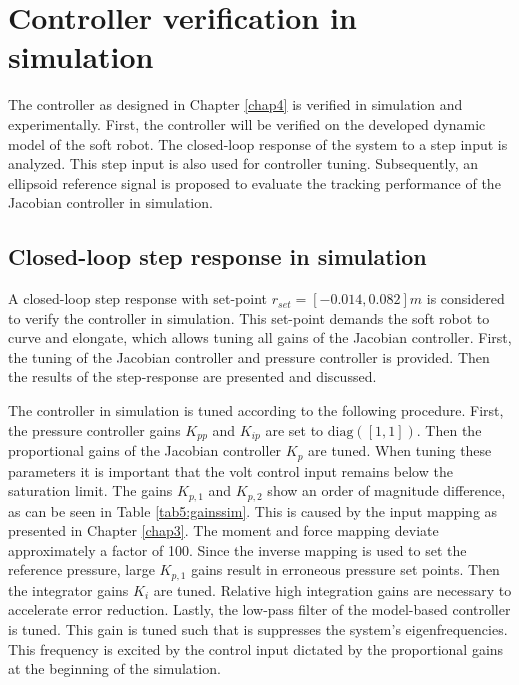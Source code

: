 \section{Controller verification in simulation}

The controller as designed in Chapter \ref{chap4} is verified in simulation and experimentally. First, the controller will be verified on the developed dynamic model of the soft robot. The closed-loop response of the system to a step input is analyzed. This step input is also used for controller tuning. Subsequently, an ellipsoid reference signal is proposed to evaluate the tracking performance of the Jacobian controller in simulation. 


\subsection*{Closed-loop step response in simulation}

A closed-loop step response with set-point $r_{set} = [-0.014,0.082]m$ is considered to verify the controller in simulation. This set-point demands the soft robot to curve and elongate, which allows tuning all gains of the Jacobian controller. First, the tuning of the Jacobian controller and pressure controller is provided. Then the results of the step-response are presented and discussed. 

The controller in simulation is tuned according to the following procedure. First, the pressure controller gains $K_{pp}$ and $K_{ip}$ are set to $\text{diag}([1,1])$. Then the proportional gains of the Jacobian controller $K_p$ are tuned. When tuning these parameters it is important that the volt control input remains below the saturation limit. The gains $K_{p,1}$ and $K_{p,2}$ show an order of magnitude difference, as can be seen in Table \ref{tab5:gainssim}. This is caused by the input mapping as presented in Chapter \ref{chap3}. The moment and force mapping deviate approximately a factor of 100. Since the inverse mapping is used to set the reference pressure, large $K_{p,1}$ gains result in erroneous pressure set points. Then the integrator gains $K_i$ are tuned. Relative high integration gains are necessary to accelerate error reduction. Lastly, the low-pass filter of the model-based controller is tuned. This gain is tuned such that is suppresses the system's eigenfrequencies. This frequency is excited by the control input dictated by the proportional gains at the beginning of the simulation. 



